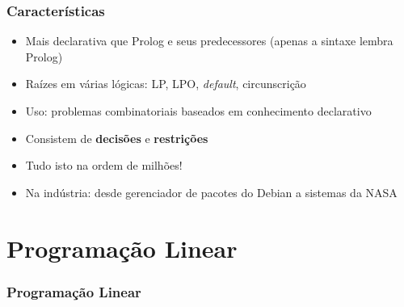 \documentclass{beamer}
\begin{document}









\begin{frame}[allowframebreaks]

\frametitle{Características}


\begin{block}{}
  \begin{itemize}
  
  \item Mais declarativa que Prolog e seus predecessores (apenas a sintaxe lembra Prolog)

  \item Raízes em várias lógicas: LP, LPO, \emph{default}, circunscrição

  \item Uso: problemas combinatoriais baseados em conhecimento declarativo

    \item Consistem de \textbf{decisões} e \textbf{restrições}

      \item Tudo isto na ordem de milhões!
      
      \item Na indústria: desde gerenciador de pacotes do Debian a sistemas da NASA
        

    \end{itemize}
  
\end{block}


\end{frame}

















\section{Programação Linear}
\begin{frame}
	\frametitle{Programação Linear}
	
	\begin{figure}[ht!]
		\centering
	\end{figure}
	
\end{frame}
\end{document}
